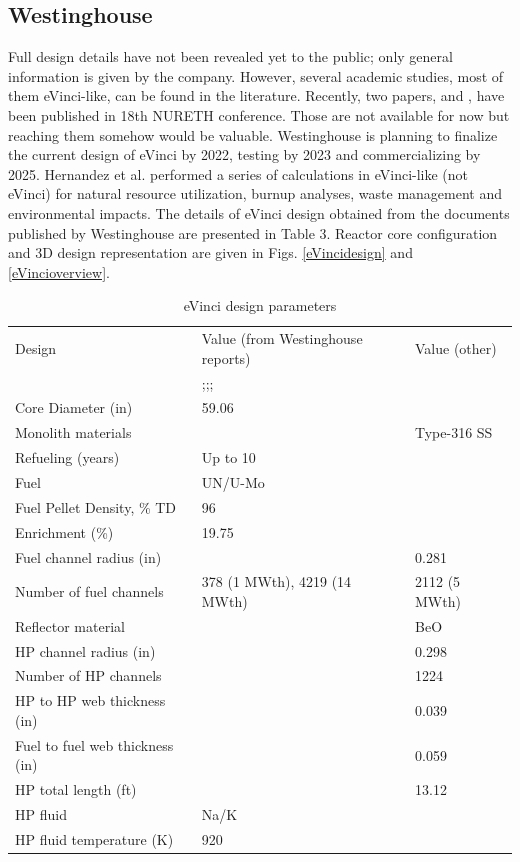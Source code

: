 \documentclass[10pt,a4paper]{article}
\begin{document}
\restoregeometry

\pagebreak
\subsection{Westinghouse}
Full design details have not been revealed yet to the public; only general information is given by the company. However, several academic studies, most of them eVinci-like, can be found in the literature. Recently, two papers, \cite{hong_thermal_2019} and \cite{wright_phenomena_2019}, have been published in 18th \gls{NURETH} conference. Those are not available for now but reaching them somehow would be valuable. Westinghouse is planning to finalize the current design of eVinci by 2022, testing by 2023 and commercializing by 2025. Hernandez et al. \cite{hernandez_micro_2019} performed a series of calculations in eVinci-like (not eVinci) for natural resource utilization, burnup analyses, waste management and environmental impacts. The details of eVinci design obtained from the documents published by Westinghouse are presented in Table 3. Reactor core configuration and 3D design representation are given in Figs. \ref{eVincidesign} and \ref{eVincioverview}.

\begin{table} [ht]
\begin{center}

\caption{eVinci design parameters}
\begin{tabular}{l  l  l}
\hline
Design 		&Value (from Westinghouse reports) 		& Value (other) \cite{hernandez_micro_2019}\\ 
	& 	\cite{iaea_advances_2018};\cite{levinsky_westinghouse_2018};\cite{yan_technology_2020};\cite{arafat_evinci_2019} 	&  \\ 
\hline
Core Diameter (in) 		&59.06 		&  \\ 
Monolith materials 		& 		& Type-316 SS	\\ 
Refueling (years) 		&Up to 10 		&  \\ 
Fuel 		&UN/U-Mo 		& 	 \\ 
Fuel Pellet Density, \% TD 		&96 		&  \\ 
Enrichment (\%) 		&19.75 		&  \\ 
Fuel channel radius (in) 		& 		& 0.281 \\ 
Number of fuel channels 		&378 (1 MWth), 4219 (14 MWth)		& 2112 (5 MWth) \\ 
Reflector material 		&		& BeO\\ 
\gls{HP} channel radius (in) 		&		& 0.298\\ 
Number of HP channels 		& 		& 1224\\ 
HP to HP web thickness (in) 		& 		& 0.039\\ 
Fuel to fuel web thickness (in) 		& 		& 0.059\\ 
HP total length (ft) 		&		& 13.12\\ 
HP fluid 		&Na/K		& \\ 
HP fluid temperature (K) 		&920 		& \\ 
\hline

\end{tabular}
\end{center}
\end{table}
\end{document}
